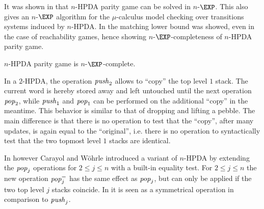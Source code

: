 \documentclass[a4paper,UKenglish,cleveref, autoref, thm-restate]{lipics-v2021}
\begin{document}
It was shown in \cite{Cach03} that {\sc $n$-HPDA parity game} can
be solved in $n$-$\EXP$. This also gives an $n$-$\EXP$ algorithm for the $\mu$-calculus
model checking over transitions systems induced by  $n$-HPDA.
In \cite{cachat2007complexity} the matching lower bound was showed, even in the case of reachability games,
hence showing $n$-$\EXP$-completeness of {\sc $n$-HPDA parity game}.

\begin{theorem}{\cite{ Cach03, cachat2007complexity}}
{\sc $n$-HPDA parity game} is $n$-$\EXP$-complete.
\end{theorem}




In a $2$-HPDA, the operation $\text{\textit{push}}_2$ %
allows to ``copy'' the top level $1$ stack. The current word is hereby stored away and left untouched
until the next operation $\text{\textit{pop}}_2$,
while $\text{\textit{push}}_1$ and $\text{\textit{pop}}_1$ can be performed on the additional ``copy'' in the meantime. This behavior is similar to that of dropping and lifting a pebble. 
The main difference is that there is no operation to test that the ``copy'', after many updates, is again equal to the ``original'', i.e. there is no operation to syntactically test that the two topmost level $1$ stacks are identical.

In \cite{CaWoe03, Woeh05, carayol2006automates} however 
Carayol and W\"ohrle
 introduced a variant of $n$-HPDA by extending the 
$\text{\textit{pop}}_j$ operations for $2 \leq j \leq n$ with a built-in equality test. 
For $2 \leq j \leq n$ 
the new operation
$\text{\textit{pop}}_j^=$ has the same effect as $\text{\textit{pop}}_j$, but
can only be applied if the two top level $j$ stacks coincide.
In \cite{carayol2006automates} it is seen as a symmetrical operation in comparison to
$\text{\textit{push}}_j$.\\
\end{document}
